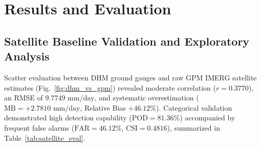 \documentclass[conference]{IEEEtran}
\begin{document}
\begin{table}[!t]
\caption{Hyperparameter and Preprocessing Configuration for Evaluated Machine Learning Classifiers}
\label{tab:hyperparameters}
\centering
{}
\end{table}

\section{Results and Evaluation}
\label{sec:results}

\subsection{Satellite Baseline Validation and Exploratory Analysis}
Scatter evaluation between DHM ground gauges and raw GPM IMERG satellite estimates (Fig.~\ref{fig:dhm_vs_gpm}) revealed moderate correlation ($r = 0.3770$), an RMSE of $9.7749\text{ mm/day}$, and systematic overestimation ($\text{MB} = +2.7810\text{ mm/day}$, Relative Bias $+46.12\%$). Categorical validation demonstrated high detection capability ($\text{POD} = 81.36\%$) accompanied by frequent false alarms ($\text{FAR} = 46.12\%$, $\text{CSI} = 0.4816$), summarized in Table~\ref{tab:satellite_eval}.
\end{document}
